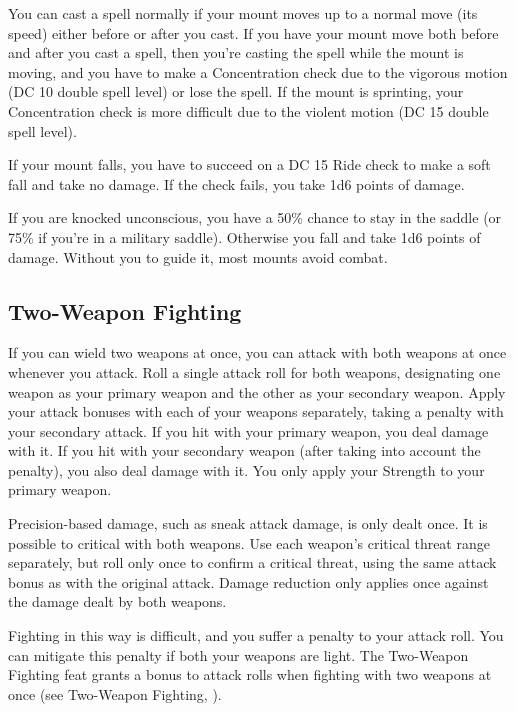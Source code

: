  You can cast a spell normally if your mount moves up to a normal move (its speed) either before or after you cast. If you have your mount move both before and after you cast a spell, then you're casting the spell while the mount is moving, and you have to make a Concentration check due to the vigorous motion (DC 10 \add double spell level) or lose the spell. If the mount is sprinting, your Concentration check is more difficult due to the violent motion (DC 15 \add double spell level).

 If your mount falls, you have to succeed on a DC 15 Ride check to make a soft fall and take no damage. If the check fails, you take 1d6 points of damage.

 If you are knocked unconscious, you have a 50\% chance to stay in the saddle (or 75\% if you're in a military saddle). Otherwise you fall and take 1d6 points of damage. Without you to guide it, most mounts avoid combat.

\subsection{Two-Weapon Fighting}\label{Two-Weapon Fighting}
If you can wield two weapons at once, you can attack with both weapons at once whenever you attack. Roll a single attack roll for both weapons, designating one weapon as your primary weapon and the other as your secondary weapon. Apply your attack bonuses with each of your weapons separately, taking a  penalty with your secondary attack. If you hit with your primary weapon, you deal damage with it. If you hit with your secondary weapon (after taking into account the  penalty), you also deal damage with it. You only apply your Strength to your primary weapon.

\par Precision-based damage, such as sneak attack damage, is only dealt once. It is possible to critical with both weapons. Use each weapon's critical threat range separately, but roll only once to confirm a critical threat, using the same attack bonus as with the original attack. Damage reduction only applies once against the damage dealt by both weapons.

\par Fighting in this way is difficult, and you suffer a  penalty to your attack roll. You can mitigate this penalty if both your weapons are light. The Two-Weapon Fighting feat grants a  bonus to attack rolls when fighting with two weapons at once (see Two-Weapon Fighting, ).

